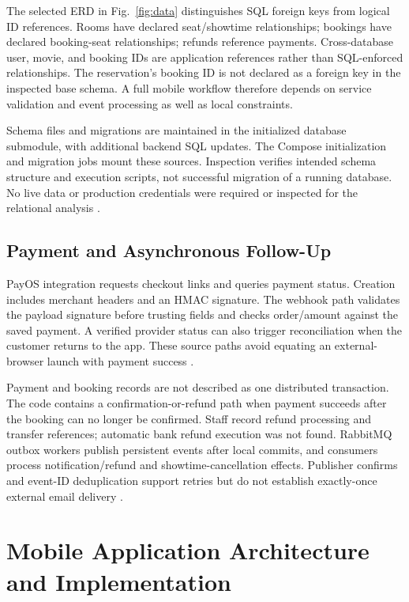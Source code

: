\documentclass[conference]{IEEEtran}
\begin{document}
The selected ERD in Fig.~\ref{fig:data} distinguishes SQL foreign keys from
logical ID references. Rooms have declared seat/showtime relationships;
bookings have declared booking-seat relationships; refunds reference payments.
Cross-database user, movie, and booking IDs are application references rather
than SQL-enforced relationships. The reservation's booking ID is not declared
as a foreign key in the inspected base schema. A full mobile workflow therefore
depends on service validation and event processing as well as local constraints.


Schema files and migrations are maintained in the initialized database
submodule, with additional backend SQL updates. The Compose initialization and
migration jobs mount these sources. Inspection verifies intended schema
structure and execution scripts, not successful migration of a running
database. No live data or production credentials were required or inspected
for the relational analysis \cite{deployment,db}.

\subsection{Payment and Asynchronous Follow-Up}
PayOS integration requests checkout links and queries payment status. Creation
includes merchant headers and an HMAC signature. The webhook path validates
the payload signature before trusting fields and checks order/amount against
the saved payment. A verified provider status can also trigger reconciliation
when the customer returns to the app. These source paths avoid equating an
external-browser launch with payment success \cite{booking,payos}.

Payment and booking records are not described as one distributed transaction.
The code contains a confirmation-or-refund path when payment succeeds after
the booking can no longer be confirmed. Staff record refund processing and
transfer references; automatic bank refund execution was not found. RabbitMQ
outbox workers publish persistent events after local commits, and consumers
process notification/refund and showtime-cancellation effects. Publisher
confirms and event-ID deduplication support retries but do not establish
exactly-once external email delivery \cite{booking,rabbit}.

\section{Mobile Application Architecture and Implementation}
\end{document}
